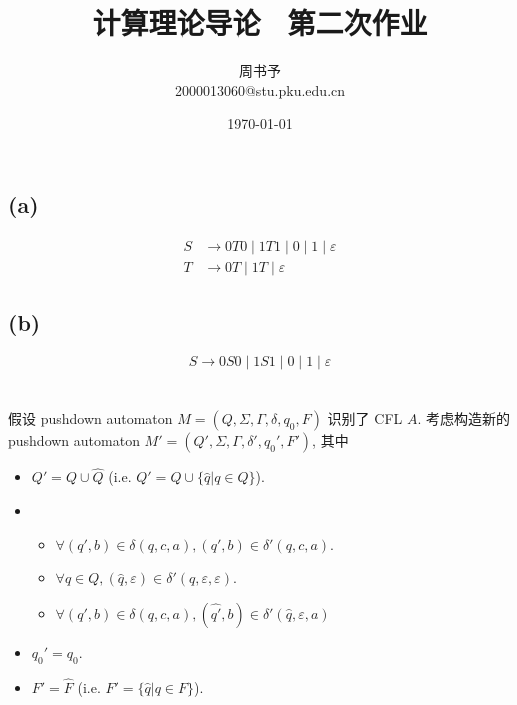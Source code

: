 \documentclass[8pt]{article}
\title{\heiti\zihao{1} 计算理论导论 \ 第二次作业}
\author{\kaishu\zihao{-3} 周书予\\2000013060@stu.pku.edu.cn}
\date{\today}
\theoremstyle{compact}
\begin{document}
\pagestyle{plain}



\maketitle
\section{}
\subsection*{(a)}
\begin{equation*}
	\begin{split}
		S &\to 0T0 \mid 1T1 \mid 0 \mid 1 \mid \varepsilon\\
		T &\to 0T \mid 1T \mid \varepsilon
	\end{split}
\end{equation*}
\subsection*{(b)}
\begin{equation*}
	S \to 0S0 \mid 1S1 \mid 0 \mid 1 \mid \varepsilon
\end{equation*}

\section{}
假设 pushdown automaton $M = (Q, \Sigma, \Gamma, \delta, q_0, F)$ 识别了 CFL $A$. 考虑构造新的 pushdown automaton $M' = (Q', \Sigma, \Gamma, \delta', q_0', F')$, 其中
\begin{itemize}
	\item $Q' = Q \cup \hat{Q}$ (i.e. $Q' = Q \cup \{\hat{q} | q \in Q\}$).
	\item \begin{itemize}
		\item $\forall (q', b) \in \delta(q, c, a), (q', b) \in \delta'(q, c, a)$.
		\item $\forall q \in Q, (\hat{q}, \varepsilon) \in \delta'(q, \varepsilon, \varepsilon)$.
		\item $\forall (q', b) \in \delta(q, c, a), (\hat{q'}, b) \in \delta'(\hat{q}, \varepsilon, a)$
	\end{itemize}
	\item $q_0' = q_0$.
	\item $F' = \hat{F}$ (i.e. $F' = \{\hat{q} | q \in F\}$).
\end{itemize}
\end{document}
